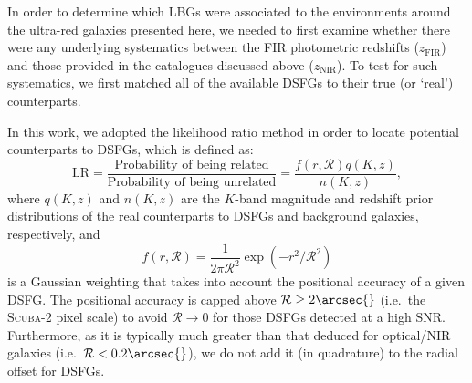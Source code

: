 \documentclass[a4paper, fleqn, usenatbib]{mnras}
\newcommand{\scuba}{\mbox{\textsc{Scuba}-2}}
\newcommand{\urgs}{ultra-red galaxies}
\newcommand{\znir}{z_{\text{NIR}}}
\newcommand{\zfir}{z_{\text{FIR}}}
\begin{document}
In order to determine which LBGs were associated to the environments around the \urgs{} presented here, we needed to first examine whether there were any underlying systematics between the FIR photometric redshifts ($\zfir{}$) and those provided in the catalogues discussed above ($\znir{}$).
To test for such systematics, we first matched all of the available DSFGs to their true (or `real') counterparts.

In this work, we adopted the likelihood ratio \citep[LR ---][]{chapin11, fleuren12, mcalpine13} method in order to locate potential counterparts to DSFGs, which is defined as:
\begin{equation}
    \label{eq:likelihood_ratio}
    \text{LR} = \frac{\text{Probability of being related}}{\text{Probability of being unrelated}} = \frac{f(r,\mathcal{R})q(K,z)}{n(K,z)},
\end{equation}
\noindent
where $q(K,z)$ and $n(K,z)$ are the $K$-band magnitude and redshift prior distributions of the real counterparts to DSFGs and background galaxies, respectively, and $$f(r,\mathcal{R})=\frac{1}{2\pi\mathcal{R}^2}\exp{(-r^2/\mathcal{R}^2)}$$ is a Gaussian weighting that takes into account the positional accuracy of a given DSFG.
The positional accuracy is capped above $\mathcal{R}\ge2\arcsec{}$ (i.e.\ the \scuba{} pixel scale) to avoid $\mathcal{R}\to0$ for those DSFGs detected at a high SNR.
Furthermore, as it is typically much greater than that deduced for optical/NIR galaxies (i.e.\ $\mathcal{R}<0.2\arcsec{}$), we do not add it (in quadrature) to the radial offset for DSFGs.
\end{document}
